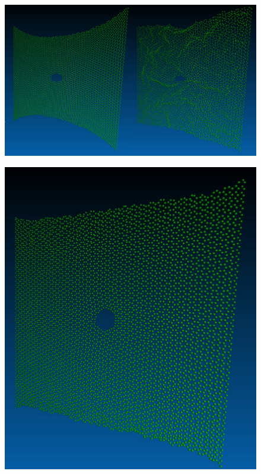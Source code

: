 \begin{figure}[H]
\begin{center}
\includegraphics[width=0.5\textwidth]{snapmembranetendue.jpg}\includegraphics[width=0.5\textwidth]{snapmembranesouspression.jpg}
\begin{minipage}{0.5\linewidth}
\includegraphics[width=1\textwidth]{snapmembranenontendue.jpg} 

\end{minipage}
\end{center}
\end{figure}
